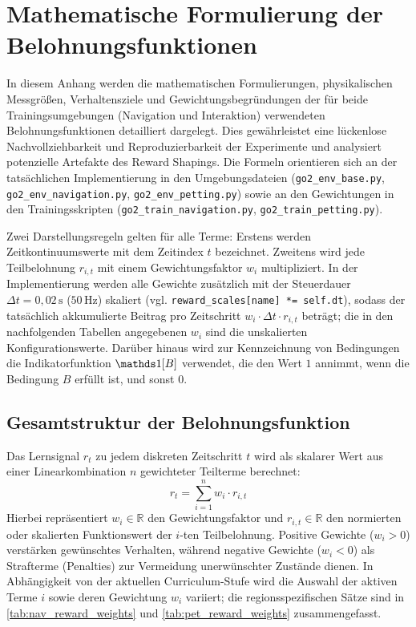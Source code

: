 ﻿\chapter{Mathematische Formulierung der Belohnungsfunktionen}\label{ch:reward_function_maths}

In diesem Anhang werden die mathematischen Formulierungen, physikalischen Messgrößen, Verhaltensziele und Gewichtungsbegründungen der für beide Trainingsumgebungen (Navigation und Interaktion) verwendeten Belohnungsfunktionen detailliert dargelegt. Dies gewährleistet eine lückenlose Nachvollziehbarkeit und Reproduzierbarkeit der Experimente und analysiert potenzielle Artefakte des Reward Shapings. Die Formeln orientieren sich an der tatsächlichen Implementierung in den Umgebungsdateien (\texttt{go2\allowbreak\_env\allowbreak\_base.py}, \texttt{go2\allowbreak\_env\allowbreak\_navigation.py}, \texttt{go2\allowbreak\_env\allowbreak\_petting.py}) sowie an den Gewichtungen in den Trainingsskripten (\texttt{go2\allowbreak\_train\allowbreak\_navigation.py}, \texttt{go2\allowbreak\_train\allowbreak\_petting.py}).~\newline

Zwei Darstellungsregeln gelten für alle Terme: Erstens werden Zeitkontinuumswerte mit dem Zeitindex $t$ bezeichnet. Zweitens wird jede Teilbelohnung $r_{i,t}$ mit einem Gewichtungsfaktor $w_i$ multipliziert. In der Implementierung werden alle Gewichte zusätzlich mit der Steuerdauer $\Delta t = 0{,}02\,\text{s}$ ($50\,\text{Hz}$) skaliert (vgl. \texttt{reward\_scales[name]}{}\texttt{ *= self.dt}), sodass der tatsächlich akkumulierte Beitrag pro Zeitschritt $w_i \cdot \Delta t \cdot r_{i,t}$ beträgt; die in den nachfolgenden Tabellen angegebenen $w_i$ sind die unskalierten Konfigurationswerte. Darüber hinaus wird zur Kennzeichnung von Bedingungen die Indikatorfunktion $\ind[B]$ verwendet, die den Wert $1$ annimmt, wenn die Bedingung $B$ erfüllt ist, und sonst $0$.

\section{Gesamtstruktur der Belohnungsfunktion}

Das Lernsignal $r_t$ zu jedem diskreten Zeitschritt $t$ wird als skalarer Wert aus einer Linearkombination $n$ gewichteter Teilterme berechnet:
\begin{equation}\label{eq:total_reward_generic}
r_t = \sum_{i=1}^{n} w_i \cdot r_{i,t}
\end{equation}
Hierbei repräsentiert $w_i \in \mathbb{R}$ den Gewichtungsfaktor und $r_{i,t} \in \mathbb{R}$ den normierten oder skalierten Funktionswert der $i$-ten Teilbelohnung. Positive Gewichte ($w_i > 0$) verstärken gewünschtes Verhalten, während negative Gewichte ($w_i < 0$) als Strafterme (Penalties) zur Vermeidung unerwünschter Zustände dienen. In Abhängigkeit von der aktuellen Curriculum-Stufe wird die Auswahl der aktiven Terme $i$ sowie deren Gewichtung $w_i$ variiert; die regionsspezifischen Sätze sind in \autoref{tab:nav_reward_weights} und \autoref{tab:pet_reward_weights} zusammengefasst.

